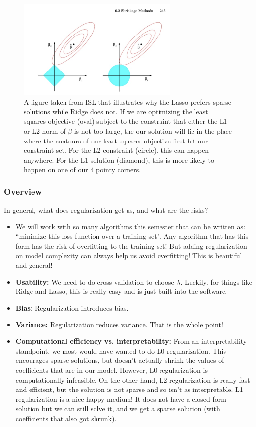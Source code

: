 \begin{figure}
\centering
	\includegraphics[width=0.7\textwidth]{442_lecs/magicpic.png}
	\caption{A figure taken from ISL that illustrates why the Lasso prefers sparse solutions while Ridge does not. If we are optimizing the least squares objective (oval) subject to the constraint that either the L1 or L2 norm of $\beta$ is not too large, the our solution will lie in the place where the contours of our least squares objective first hit our constraint set. For the L2 constraint (circle), this can happen anywhere. For the L1 solution (diamond), this is more likely to happen on one of our 4 pointy corners.}
	\label{fig_lassoridge}
\end{figure}


\subsubsection{Overview}

In general, what does regularization get us, and what are the risks?

\begin{itemize}
\item We will work with so many algorithms this semester that can be written as: ``minimize this loss function over a training set". Any algorithm that has this form has the risk of overfitting to the training set! But adding regularization on model complexity can always help us avoid overfitting! This is beautiful and general!
\item \textbf{Usability:} We need to do cross validation to choose $\lambda$. Luckily, for things like Ridge and Lasso, this is really easy and is just built into the software. 
\item \textbf{Bias:} Regularization introduces bias.
\item \textbf{Variance: } Regularization reduces variance. That is the whole point!
\item \textbf{Computational efficiency vs. interpretability: } From an interpretability standpoint, we most would have wanted to do L0 regularization. This encourages sparse solutions, but doesn't actually shrink the values of coefficients that are in our model. However, L0 regularization is computationally infeasible. On the other hand, L2 regularization is really fast and efficient, but the solution is not sparse and so isn't as interpretable. L1 regularization is a nice happy medium! It does not have a closed form solution but we can still solve it, and we get a sparse solution (with coefficients that also got shrunk). 
\end{itemize}


